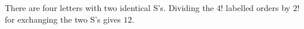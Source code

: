 There are four letters with two identical S's. Dividing the $4!$ labelled orders by $2!$ for exchanging the two S's gives $\boxed{12}$.
